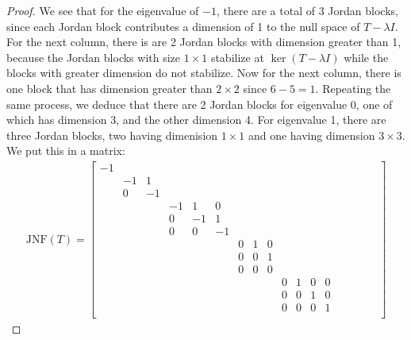 \documentclass{article}
\begin{document}
    \begin{proof}
        We see that for the eigenvalue of $-1$, there are a total of $3$ Jordan blocks, since each Jordan block contributes a dimension of 1 to the null space of $T - \lambda I$. For the next column, there is are 2 Jordan blocks with dimension greater than 1, because the Jordan blocks with size $1 \times 1$ stabilize at $\ker{(T - \lambda I)}$ while the blocks with greater dimension do not stabilize. Now for the next column, there is one block that has dimension greater than $2 \times 2$ since $6 - 5 = 1$. Repeating the same process, we deduce that there are 2 Jordan blocks for eigenvalue 0, one of which has dimension 3, and the other dimension 4. For eigenvalue 1, there are three Jordan blocks, two having dimenision $1 \times 1$ and one having dimension $3 \times 3$. We put this in a matrix:
        \begin{align*}
            \text{JNF}(T) = 
                \begin{bmatrix}
                    -1 &    &    &    &    &    &   &   &   &   &   &   &   &   &   &   &   &   \\
                       & -1 & 1  &    &    &    &   &   &   &   &   &   &   &   &   &   &   &   \\
                       & 0  & -1 &    &    &    &   &   &   &   &   &   &   &   &   &   &   &   \\
                       &    &    & -1 & 1  & 0  &   &   &   &   &   &   &   &   &   &   &   &   \\
                       &    &    & 0  & -1 & 1  &   &   &   &   &   &   &   &   &   &   &   &   \\
                       &    &    & 0  & 0  & -1 &   &   &   &   &   &   &   &   &   &   &   &   \\
                       &    &    &    &    &    & 0 & 1 & 0 &   &   &   &   &   &   &   &   &   \\
                       &    &    &    &    &    & 0 & 0 & 1 &   &   &   &   &   &   &   &   &   \\
                       &    &    &    &    &    & 0 & 0 & 0 &   &   &   &   &   &   &   &   &   \\
                       &    &    &    &    &    &   &   &   & 0 & 1 & 0 & 0 &   &   &   &   &   \\
                       &    &    &    &    &    &   &   &   & 0 & 0 & 1 & 0 &   &   &   &   &   \\
                       &    &    &    &    &    &   &   &   & 0 & 0 & 0 & 1 &   &   &   &   &   \\

\end{bmatrix}
\end{align*}
\end{proof}
\end{document}
